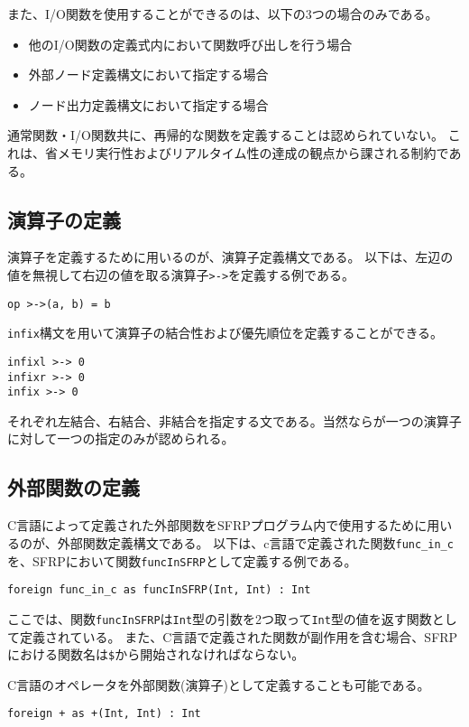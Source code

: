 また、I/O関数を使用することができるのは、以下の3つの場合のみである。
\begin{itemize}
  \item 他のI/O関数の定義式内において関数呼び出しを行う場合
  \item 外部ノード定義構文において指定する場合
  \item ノード出力定義構文において指定する場合
\end{itemize}

通常関数・I/O関数共に、再帰的な関数を定義することは認められていない。
これは、省メモリ実行性およびリアルタイム性の達成の観点から課される制約である。

\subsection{演算子の定義}
演算子を定義するために用いるのが、演算子定義構文である。
以下は、左辺の値を無視して右辺の値を取る演算子\texttt{>->}を定義する例である。
\begin{lstlisting}[basicstyle=\ttfamily\small,language=SFRP]
op >->(a, b) = b
\end{lstlisting}

\texttt{infix}構文を用いて演算子の結合性および優先順位を定義することができる。
\begin{lstlisting}[basicstyle=\ttfamily\small,language=SFRP]
infixl >-> 0
infixr >-> 0
infix >-> 0
\end{lstlisting}
それぞれ左結合、右結合、非結合を指定する文である。当然ならが一つの演算子に対して一つの指定のみが認められる。

\subsection{外部関数の定義}
C言語によって定義された外部関数をSFRPプログラム内で使用するために用いるのが、外部関数定義構文である。
以下は、c言語で定義された関数\texttt{func\_in\_c}を、SFRPにおいて関数\texttt{funcInSFRP}として定義する例である。
\begin{lstlisting}[basicstyle=\ttfamily\small,language=SFRP]
foreign func_in_c as funcInSFRP(Int, Int) : Int
\end{lstlisting}
ここでは、関数\texttt{funcInSFRP}は\texttt{Int}型の引数を2つ取って\texttt{Int}型の値を返す関数として定義されている。
また、C言語で定義された関数が副作用を含む場合、SFRPにおける関数名は\texttt{\$}から開始されなければならない。

C言語のオペレータを外部関数(演算子)として定義することも可能である。
\begin{lstlisting}[basicstyle=\ttfamily\small,language=SFRP]
foreign + as +(Int, Int) : Int
\end{lstlisting}


